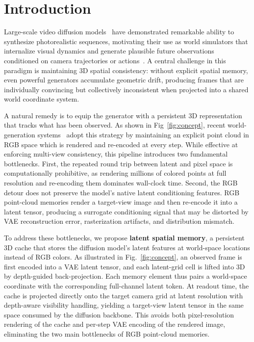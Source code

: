 \section{Introduction}

Large-scale video diffusion models~\cite{sora,wan2025wan,kong2024hunyuanvideo,yang2024cogvideox,blattmann2023stable} have demonstrated remarkable ability to synthesize photorealistic sequences, motivating their use as world simulators that internalize visual dynamics and generate plausible future observations conditioned on camera trajectories or actions~\cite{bruce2024genie,parkerholder2024genie2,valevski2024diffusion,alonso2024diffusion,che2024gamegen}. A central challenge in this paradigm is maintaining 3D spatial consistency: without explicit spatial memory, even powerful generators accumulate geometric drift, producing frames that are individually convincing but collectively inconsistent when projected into a shared world coordinate system.

A natural remedy is to equip the generator with a persistent 3D representation that tracks what has been observed. As shown in Fig~\ref{fig:concept}, recent world-generation systems~\cite{zhao2026spatia,huang2025voyager,yu2024wonderworld,yu2024wonderjourney,duan2026liveworld,wang2025drivegen3d,wang2026world,wu2025video,chou2025captain} adopt this strategy by maintaining an explicit point cloud in RGB space which is rendered and re-encoded at every step. While effective at enforcing multi-view consistency, this pipeline introduces two fundamental bottlenecks. First, the repeated round trip between latent and pixel space is computationally prohibitive, as rendering millions of colored points at full resolution and re-encoding them dominates wall-clock time. Second, the RGB detour does not preserve the model's native latent conditioning features. RGB point-cloud memories render a target-view image and then re-encode it into a latent tensor, producing a surrogate conditioning signal that may be distorted by VAE reconstruction error, rasterization artifacts, and distribution mismatch.

To address these bottlenecks, we propose \textbf{latent spatial memory}, a persistent 3D cache that stores the diffusion model's latent features at world-space locations instead of RGB colors. As illustrated in Fig.~\ref{fig:concept}, an observed frame is first encoded into a VAE latent tensor, and each latent-grid cell is lifted into 3D by depth-guided back-projection. Each memory element thus pairs a world-space coordinate with the corresponding full-channel latent token. At readout time, the cache is projected directly onto the target camera grid at latent resolution with depth-aware visibility handling, yielding a target-view latent tensor in the same space consumed by the diffusion backbone. This avoids both pixel-resolution rendering of the cache and per-step VAE encoding of the rendered image, eliminating the two main bottlenecks of RGB point-cloud memories.

